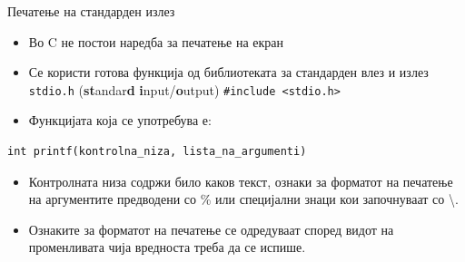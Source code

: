 \begin{frame}[fragile]{Печатење на стандарден излез}
\begin{itemize}
\item Во C не постои наредба за печатење на екран
\item Се користи готова функција од библиотеката за стандарден влез и излез \texttt{stdio.h} (\textbf{st}andar\textbf{d} \textbf{i}nput/\textbf{o}utput)
\large{\texttt{\#include <stdio.h>}}
\item Функцијата која се употребува е:
\end{itemize}
\begin{verbatim}
int printf(kontrolna_niza, lista_na_argumenti)
\end{verbatim}
\begin{itemize}
\item Контролната низа содржи било каков текст, ознаки за форматот на печатење на аргументите предводени со \% 
или специјални знаци кои започнуваат со \textbackslash. 
\item Ознаките за форматот на печатење се одредуваат според видот на променливата чија вредноста треба да се испише.
\end{itemize}
\end{frame}

